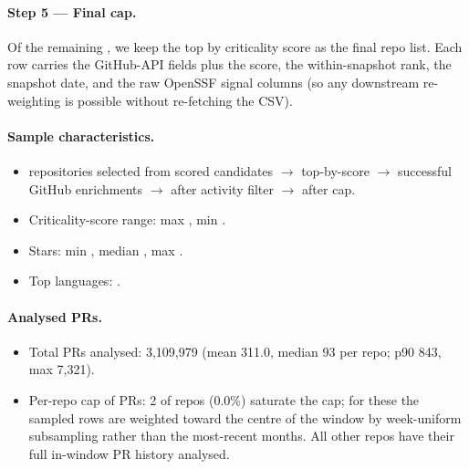 \paragraph{Step 5 --- Final cap.} Of the remaining \PLACEHOLDERPOSTACTIVITY{}, we keep the top
\PLACEHOLDERFINALCAP{} by criticality score as the final repo list.
Each row carries the GitHub-API fields plus the score, the within-snapshot
rank, the snapshot date, and the raw OpenSSF signal columns (so any
downstream re-weighting is possible without re-fetching the CSV).

\paragraph{Sample characteristics.}
\begin{itemize}
\item \PLACEHOLDERFINALCAP{} repositories selected from
\PLACEHOLDERSNAPSHOTROWS{} scored candidates $\to$ \PLACEHOLDERCANDCAP{}
top-by-score $\to$ \PLACEHOLDERENRICHOK{} successful GitHub enrichments
$\to$ \PLACEHOLDERPOSTACTIVITY{} after activity filter $\to$
\PLACEHOLDERFINALCAP{} after cap.
\item Criticality-score range: max \PLACEHOLDERSCOREMAX{}, min \PLACEHOLDERSCOREMIN{}.
\item Stars: min \PLACEHOLDERSTARMIN{}, median \PLACEHOLDERSTARMED{}, max \PLACEHOLDERSTARMAX{}.
\item Top languages: \PLACEHOLDERLANGTOP{}.
\end{itemize}

\paragraph{Analysed PRs.}
\begin{itemize}
\item Total PRs analysed: 3,109,979 (mean 311.0, median 93 per repo; p90 843, max 7,321).
\item Per-repo cap of \PLACEHOLDERPRSCAP{} PRs: 2 of \PLACEHOLDERFINALCAP{} repos (0.0\%) saturate the cap; for these the sampled rows are weighted toward the centre of the window by week-uniform subsampling rather than the most-recent months. All other repos have their full in-window PR history analysed.
\end{itemize}

